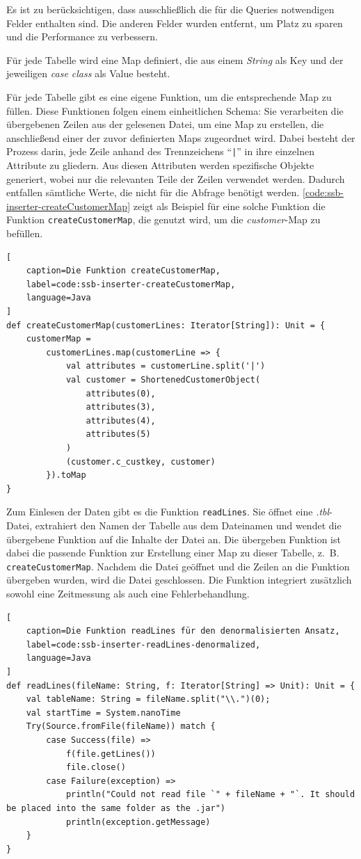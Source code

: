 Es ist zu berücksichtigen, dass ausschließlich die für die Queries notwendigen Felder enthalten sind. Die anderen Felder wurden entfernt, um Platz zu sparen und die Performance zu verbessern.

Für jede Tabelle wird eine Map definiert, die aus einem \emph{String} als Key und der jeweiligen \emph{case class} als Value besteht.

Für jede Tabelle gibt es eine eigene Funktion, um die entsprechende Map zu füllen. Diese Funktionen folgen einem einheitlichen Schema: Sie verarbeiten die übergebenen Zeilen aus der gelesenen Datei, um eine Map zu erstellen, die anschließend einer der zuvor definierten Maps zugeordnet wird. Dabei besteht der Prozess darin, jede Zeile anhand des Trennzeichens \enquote{\lstinline+|+} in ihre einzelnen Attribute zu gliedern. Aus diesen Attributen werden spezifische Objekte generiert, wobei nur die relevanten Teile der Zeilen verwendet werden. Dadurch entfallen sämtliche Werte, die nicht für die Abfrage benötigt werden. \cref{code:ssb-inserter-createCustomerMap} zeigt als Beispiel für eine solche Funktion die Funktion  \lstinline|createCustomerMap|, die genutzt wird, um die \emph{customer}-Map zu befüllen.

\begin{lstlisting}[
    caption=Die Funktion createCustomerMap,
    label=code:ssb-inserter-createCustomerMap,
    language=Java
]
def createCustomerMap(customerLines: Iterator[String]): Unit = {
	customerMap =
		customerLines.map(customerLine => {
			val attributes = customerLine.split('|')
			val customer = ShortenedCustomerObject(
				attributes(0),
				attributes(3),
				attributes(4),
				attributes(5)
			)
			(customer.c_custkey, customer)
		}).toMap
}
\end{lstlisting}


Zum Einlesen der Daten gibt es die Funktion \lstinline|readLines|. Sie öffnet eine \emph{.tbl}-Datei, extrahiert den Namen der Tabelle aus dem Dateinamen und wendet die übergebene Funktion auf die Inhalte der Datei an. Die übergeben Funktion ist dabei die passende Funktion zur Erstellung einer Map zu dieser Tabelle, z.~B. \lstinline|createCustomerMap|. Nachdem die Datei geöffnet und die Zeilen an die Funktion übergeben wurden, wird die Datei geschlossen. Die Funktion integriert zusätzlich sowohl eine Zeitmessung als auch eine Fehlerbehandlung.

\begin{lstlisting}[
    caption=Die Funktion readLines für den denormalisierten Ansatz,
    label=code:ssb-inserter-readLines-denormalized,
    language=Java
]
def readLines(fileName: String, f: Iterator[String] => Unit): Unit = {
	val tableName: String = fileName.split("\\.")(0);
	val startTime = System.nanoTime
	Try(Source.fromFile(fileName)) match {
		case Success(file) =>
			f(file.getLines())
			file.close()
		case Failure(exception) =>
			println("Could not read file `" + fileName + "`. It should be placed into the same folder as the .jar")
			println(exception.getMessage)
	}
}
\end{lstlisting}

